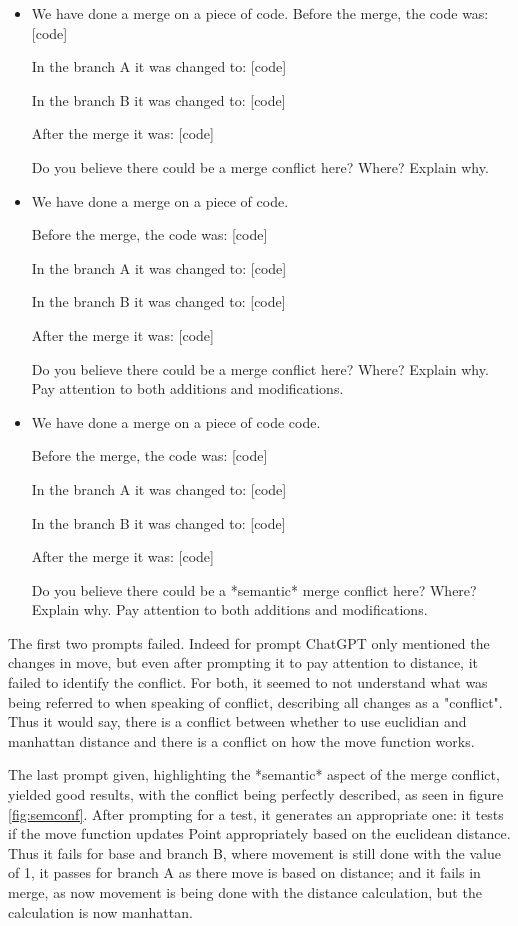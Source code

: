 \begin{itemize}
  \item We have done a merge on a piece of code.
Before the merge, the code was: [code]

In the branch A it was changed to: [code]

In the branch B it was changed to: [code]

After the merge it was: [code]

Do you believe there could be a merge conflict here? Where? Explain why.
  \item We have done a merge on a piece of code.
  
Before the merge, the code was: [code]

In the branch A it was changed to: [code]

In the branch B it was changed to: [code]

After the merge it was: [code]

Do you believe there could be a merge conflict here? Where? Explain why. Pay attention to both additions and modifications.
  \item We have done a merge on a piece of code code.
  
Before the merge, the code was: [code]

In the branch A it was changed to: [code]

In the branch B it was changed to: [code]

After the merge it was: [code]

Do you believe there could be a *semantic* merge conflict here? Where? Explain why. Pay attention to both additions and modifications.

\end{itemize}

The first two prompts failed. Indeed for prompt ChatGPT only mentioned the changes in move, but even after prompting it to pay attention to distance, it failed to identify the conflict. For both, it seemed to not understand what was being referred to when speaking of conflict, describing all changes as a "conflict". Thus it would say, there is a conflict between whether to use euclidian and manhattan distance and there is a conflict on how the move function works.

The last prompt given, highlighting the *semantic* aspect of the merge conflict, yielded good results, with the conflict being perfectly described, as seen in figure \ref{fig:semconf}. After prompting for a test, it generates an appropriate one: it tests if the move function updates Point appropriately based on the euclidean distance. Thus it fails for base and branch B, where movement is still done with the value of 1, it passes for branch A as there move is based on distance; and it fails in merge, as now movement is being done with the distance calculation, but the calculation is now manhattan.


